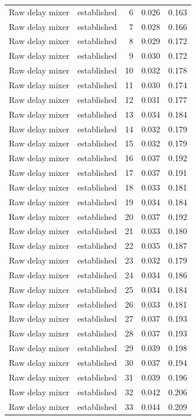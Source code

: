 \begin{tabular}{llrrr}
Raw delay mixer & established & 6 & 0.026 & 0.163 \\
Raw delay mixer & established & 7 & 0.028 & 0.166 \\
Raw delay mixer & established & 8 & 0.029 & 0.172 \\
Raw delay mixer & established & 9 & 0.030 & 0.172 \\
Raw delay mixer & established & 10 & 0.032 & 0.178 \\
Raw delay mixer & established & 11 & 0.030 & 0.174 \\
Raw delay mixer & established & 12 & 0.031 & 0.177 \\
Raw delay mixer & established & 13 & 0.034 & 0.184 \\
Raw delay mixer & established & 14 & 0.032 & 0.179 \\
Raw delay mixer & established & 15 & 0.032 & 0.179 \\
Raw delay mixer & established & 16 & 0.037 & 0.192 \\
Raw delay mixer & established & 17 & 0.037 & 0.191 \\
Raw delay mixer & established & 18 & 0.033 & 0.181 \\
Raw delay mixer & established & 19 & 0.034 & 0.184 \\
Raw delay mixer & established & 20 & 0.037 & 0.192 \\
Raw delay mixer & established & 21 & 0.033 & 0.180 \\
Raw delay mixer & established & 22 & 0.035 & 0.187 \\
Raw delay mixer & established & 23 & 0.032 & 0.179 \\
Raw delay mixer & established & 24 & 0.034 & 0.186 \\
Raw delay mixer & established & 25 & 0.034 & 0.184 \\
Raw delay mixer & established & 26 & 0.033 & 0.181 \\
Raw delay mixer & established & 27 & 0.037 & 0.193 \\
Raw delay mixer & established & 28 & 0.037 & 0.193 \\
Raw delay mixer & established & 29 & 0.039 & 0.198 \\
Raw delay mixer & established & 30 & 0.037 & 0.194 \\
Raw delay mixer & established & 31 & 0.039 & 0.196 \\
Raw delay mixer & established & 32 & 0.042 & 0.206 \\
Raw delay mixer & established & 33 & 0.044 & 0.209 \\

\end{tabular}
